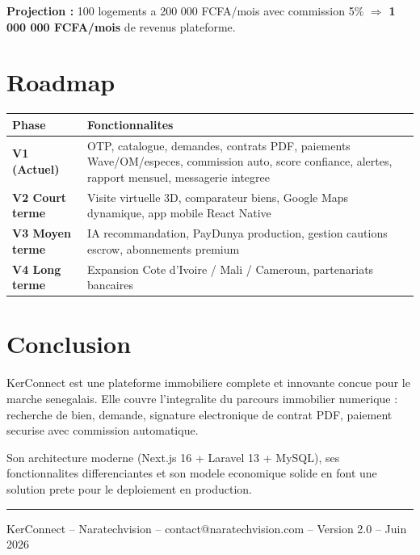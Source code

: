 \documentclass[12pt,a4paper]{article}
\begin{document}
\textbf{Projection :} 100 logements a 200 000 FCFA/mois avec commission 5\%
$\Rightarrow$ \textbf{1 000 000 FCFA/mois} de revenus plateforme.

\section{Roadmap}

\begin{center}
\begin{tabular}{|p{3cm}|p{10cm}|}
\hline
\textbf{Phase} & \textbf{Fonctionnalites} \\
\hline
\textbf{V1 (Actuel)} & OTP, catalogue, demandes, contrats PDF, paiements Wave/OM/especes, commission auto, score confiance, alertes, rapport mensuel, messagerie integree \\
\hline
\textbf{V2 Court terme} & Visite virtuelle 3D, comparateur biens, Google Maps dynamique, app mobile React Native \\
\hline
\textbf{V3 Moyen terme} & IA recommandation, PayDunya production, gestion cautions escrow, abonnements premium \\
\hline
\textbf{V4 Long terme} & Expansion Cote d'Ivoire / Mali / Cameroun, partenariats bancaires \\
\hline
\end{tabular}
\end{center}

\section*{Conclusion}

KerConnect est une plateforme immobiliere complete et innovante concue pour le marche
senegalais. Elle couvre l'integralite du parcours immobilier numerique : recherche de bien,
demande, signature electronique de contrat PDF, paiement securise avec commission automatique.

Son architecture moderne (Next.js 16 + Laravel 13 + MySQL), ses fonctionnalites
differenciantes et son modele economique solide en font une solution prete pour le
deploiement en production.

\vspace{1em}
\noindent\rule{\textwidth}{0.5pt}
\begin{center}
{\small\textcolor{kergray}{KerConnect -- Naratechvision -- contact@naratechvision.com -- Version 2.0 -- Juin 2026}}
\end{center}
\end{document}
